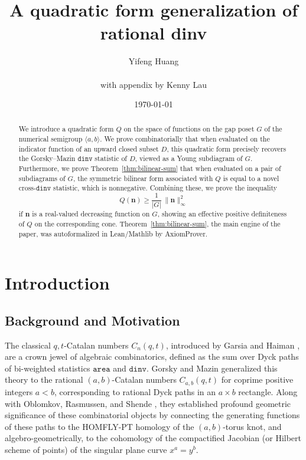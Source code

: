\documentclass[11pt,reqno]{amsart}
\title[A quadratic form generalization of rational dinv]{A quadratic form generalization of rational dinv}
\author{Yifeng Huang\\$\,$\\{\tiny with appendix by} Kenny Lau}
\date{\today}
\theoremstyle{remark}
\begin{document}
\begin{abstract}
We introduce a quadratic form $Q$ on the space of functions on the gap poset $G$ of the numerical semigroup $\langle a,b\rangle$. We prove combinatorially that when evaluated on the indicator function of an upward closed subset $D$, this quadratic form precisely recovers the Gorsky--Mazin $\mathtt{dinv}$ statistic of $D$, viewed as a Young subdiagram of $G$. Furthermore, we prove Theorem~\ref{thm:bilinear-sum} that when evaluated on a pair of subdiagrams of $G$, the symmetric bilinear form associated with $Q$ is equal to a novel cross-$\mathtt{dinv}$ statistic, which is nonnegative. Combining these, we prove the inequality
\[ Q(\mathbf{n})\geq \dfrac{1}{|G|}\,\|\mathbf{n}\|_\infty^2\]
if $\mathbf{n}$ is a real-valued decreasing function on $G$, showing an effective positive definiteness of $Q$ on the corresponding cone. Theorem~\ref{thm:bilinear-sum}, the main engine of the paper, was autoformalized in Lean/Mathlib by AxiomProver.
\end{abstract}

\maketitle

\section{Introduction}

\subsection{Background and Motivation}
The classical $q,t$-Catalan numbers $C_n(q,t)$, introduced by Garsia and Haiman \cite{GH96}, are a crown jewel of algebraic combinatorics, defined as the sum over Dyck paths of bi-weighted statistics $\mathtt{area}$ and $\mathtt{dinv}$. Gorsky and Mazin \cite{GM13, GM14} generalized this theory to the rational $(a,b)$-Catalan numbers $C_{a,b}(q,t)$ for coprime positive integers $a<b$, corresponding to rational Dyck paths in an $a \times b$ rectangle. Along with Oblomkov, Rasmussen, and Shende \cite{ORS18}, they established profound geometric significance of these combinatorial objects by connecting the generating functions of these paths to the HOMFLY-PT homology of the $(a,b)$-torus knot, and algebro-geometrically, to the cohomology of the compactified Jacobian (or Hilbert scheme of points) of the singular plane curve $x^a = y^b$. 
\end{document}
